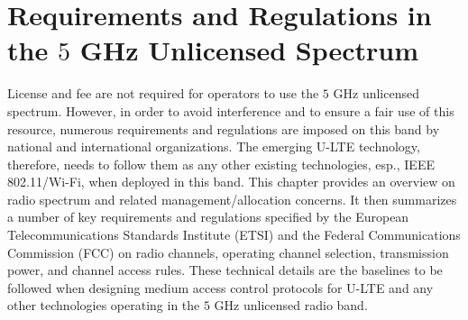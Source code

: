 %
%
%
\chapter{Requirements and Regulations in the $5$ GHz Unlicensed Spectrum}
\label{sec:LBT-overview} 


License and fee are not required for operators to use the $5$ GHz unlicensed spectrum. However, in order to avoid interference and to ensure a fair use of this resource, numerous requirements and regulations are imposed on this band by national and international organizations. The emerging U-LTE technology, therefore, needs to follow them as any other existing technologies, esp., IEEE 802.11/Wi-Fi, when deployed in this band. This chapter provides an overview on radio spectrum and related management/allocation concerns. It then summarizes a number of key requirements and regulations specified by the European Telecommunications Standards Institute (ETSI) and the Federal Communications Commission (FCC) on radio channels, operating channel selection, transmission power, and channel access rules. These technical details are the baselines to be followed when designing medium access control protocols for U-LTE and any other technologies operating in the $5$ GHz unlicensed radio band.

